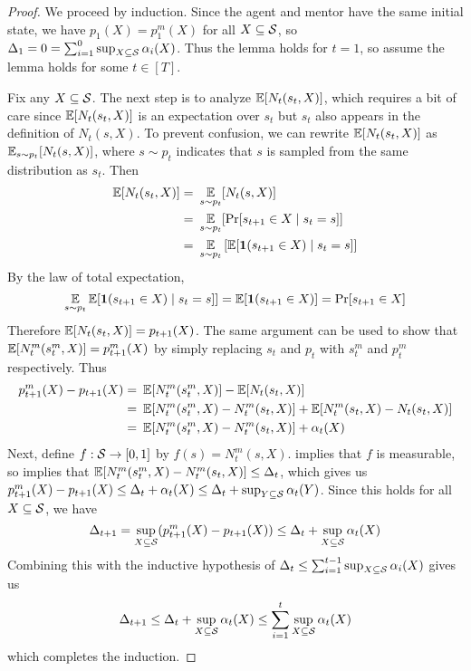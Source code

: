 \begin{proof}
We proceed by induction. Since the agent and mentor have the same initial state, we have $p_1(X) = p_1^m(X)$ for all $X \subseteq \mathcal{S}$, so $\Delta_1 = 0 = \sum_{i=1}^0 \sup_{X\subseteq\mathcal{S}} \alpha_i(X)$. Thus the lemma holds for $t=1$, so assume the lemma holds for some $t \in [T]$.

Fix any $X \subseteq \mathcal{S}$. The next step is to analyze $\operatorname*{\mathbb{E}}[N_t(s_t, X)]$, which requires a bit of care since $\operatorname*{\mathbb{E}}[N_t(s_t, X)]$ is an expectation over $s_t$ but $s_t$ also appears in the definition of $N_t(s,X)$. To prevent confusion, we can rewrite $\operatorname*{\mathbb{E}}[N_t(s_t, X)]$ as $\operatorname*{\mathbb{E}}_{s\sim p_t} [N_t(s, X)]$, where $s \sim p_t$ indicates that $s$ is sampled from the same distribution as $s_t$. Then
\begin{align*}
\operatorname*{\mathbb{E}}[N_t(s_t, X)] =&\ \operatorname*{\mathbb{E}}_{s \sim p_t}[N_t(s, X)]\\
=&\ \operatorname*{\mathbb{E}}_{s \sim p_t}[\Pr[s_{t+1} \in X \mid s_t = s]] \\
=&\ \operatorname*{\mathbb{E}}_{s \sim p_t} \left[\operatorname*{\mathbb{E}}[\boldsymbol{1}(s_{t+1} \in X) \mid s_t = s]\right] 
\end{align*}
By the law of total expectation,
\[
\operatorname*{\mathbb{E}}_{s \sim p_t} \operatorname*{\mathbb{E}}[\boldsymbol{1}(s_{t+1} \in X) \mid s_t = s]] = \operatorname*{\mathbb{E}}[\boldsymbol{1}(s_{t+1} \in X)] = \Pr[s_{t+1} \in X]
\]
Therefore $\operatorname*{\mathbb{E}}[N_t(s_t, X)] = p_{t+1}(X)$. The same argument can be used to show that $\operatorname*{\mathbb{E}}[N_t^m(s_t^m, X)] = p_{t+1}^m(X)$ by simply replacing $s_t$ and $p_t$ with $s_t^m$ and $p_t^m$ respectively. Thus
\begin{align*}
p_{t+1}^m(X) - p_{t+1}(X) =&\ \operatorname*{\mathbb{E}}[N_t^m(s_t^m, X)] - \operatorname*{\mathbb{E}}[N_t(s_t, X)]\\
=&\ \operatorname*{\mathbb{E}}[N_t^m(s_t^m, X) - N_t^m(s_t, X)] + \operatorname*{\mathbb{E}}[N_t^m(s_t, X) - N_t(s_t, X)]\\
=&\ \operatorname*{\mathbb{E}}[N_t^m(s_t^m, X) - N_t^m(s_t, X)] + \alpha_t(X)
\end{align*}
Next, define $f:\mathcal{S} \to[0,1]$ by $f(s) = N_t^m(s,X)$.  implies that $f$ is measurable, so  implies that $\operatorname*{\mathbb{E}}[N_t^m(s_t^m,X) - N_t^m(s_t, X)] \le \Delta_t$, which gives us $p_{t+1}^m(X) - p_{t+1}(X) \le \Delta_t + \alpha_t(X) \le \Delta_t + \sup_{Y\subseteq \mathcal{S}} \alpha_t(Y)$. Since this holds for all $X \subseteq \mathcal{S}$, we have 
\[
\Delta_{t+1} = \sup_{X\subseteq \mathcal{S}} (p_{t+1}^m(X) - p_{t+1}(X)) \le \Delta_t + \sup_{X\subseteq \mathcal{S}} \alpha_t(X)
\]
Combining this with the inductive hypothesis of $\Delta_t \le \sum_{i=1}^{t-1} \sup_{X \subseteq \mathcal{S}} \alpha_i(X)$ gives us
\[
\Delta_{t+1} \le \Delta_t + \sup_{X\subseteq \mathcal{S}} \alpha_t(X) \le \sum_{i=1}^t \sup_{X\subseteq \mathcal{S}} \alpha_t(X)
\]
which completes the induction.
\end{proof}

